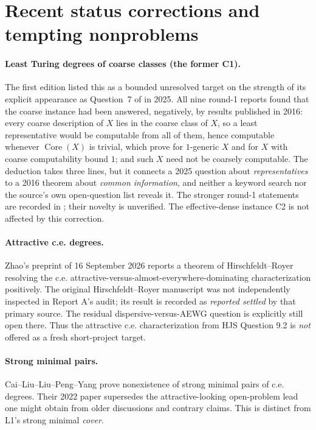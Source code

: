 \documentclass[11pt,a4paper]{article}
\newcommand{\Core}{\operatorname{Core}}\newcommand{\Low}{\mathcal L}
\theoremstyle{definition}\newtheorem{definition}[theorem]{Definition}
\theoremstyle{remark}\newtheorem{remark}[theorem]{Remark}
\begin{document}
\section{Recent status corrections and tempting nonproblems}
\label{sec:stale}

\paragraph{Least Turing degrees of coarse classes (the former C1).}
The first edition listed this as a bounded unresolved target on the strength of its explicit appearance as Question~7 of \cite{Gerdes} in 2025. All nine round-1 reports found that the coarse instance had been answered, negatively, by results published in 2016: every coarse description of $X$ lies in the coarse class of $X$, so a least representative would be computable from all of them, hence computable whenever $\Core(X)$ is trivial, which \cite[Theorems 4.2 and 4.3]{HJKS} prove for $1$-generic $X$ and for $X$ with coarse computability bound $1$; and such $X$ need not be coarsely computable. The deduction takes three lines, but it connects a 2025 question about \emph{representatives} to a 2016 theorem about \emph{common information}, and neither a keyword search nor the source's own open-question list reveals it. The stronger round-1 statements are recorded in \cite{Synthesis}; their novelty is unverified. The effective-dense instance C2 is not affected by this correction.

\paragraph{Attractive c.e. degrees.}
Zhao's preprint of 16 September 2026 reports a theorem of Hirschfeldt--Royer resolving the c.e. attractive-versus-almost-everywhere-dominating characterization positively. The original Hirschfeldt--Royer manuscript was not independently inspected in Report A's audit; its result is recorded as \emph{reported settled} by that primary source. The residual dispersive-versus-AEWG question is explicitly still open there.\cite{Zhao} Thus the attractive c.e. characterization from HJS Question 9.2 is \emph{not} offered as a fresh short-project target.

\paragraph{Strong minimal pairs.}
Cai--Liu--Liu--Peng--Yang prove nonexistence of strong minimal pairs of c.e. degrees. Their 2022 paper supersedes the attractive-looking open-problem lead one might obtain from older discussions and contrary claims. This is distinct from L1's strong minimal \emph{cover}.\cite{NoStrongPair}
\end{document}
